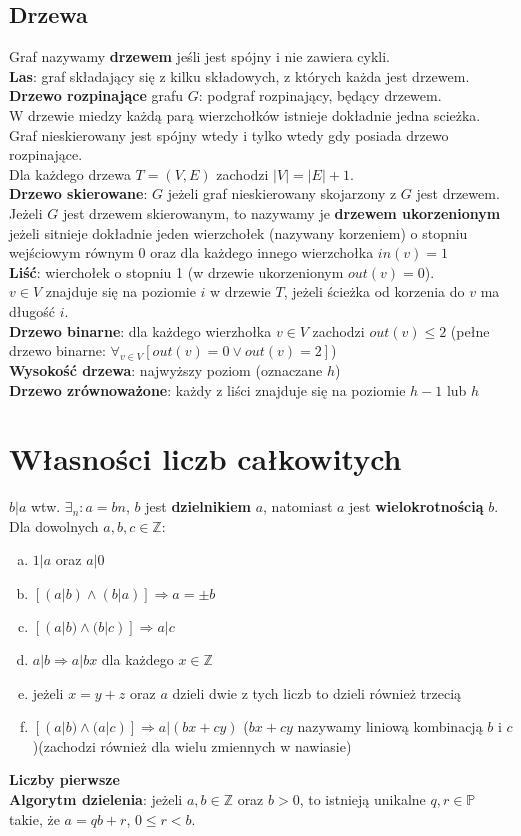 \documentclass[a4paper,12pt]{article}
\begin{document}
\subsection{Drzewa}
Graf nazywamy \textbf{drzewem} jeśli jest spójny i nie zawiera cykli.\\
\textbf{Las}: graf składający się z kilku składowych, z których każda jest drzewem.\\
\textbf{Drzewo rozpinające} grafu $G$: podgraf rozpinający, będący drzewem.\\
W drzewie miedzy każdą parą wierzchołków istnieje dokładnie jedna scieżka.\\
Graf nieskierowany jest spójny wtedy i tylko wtedy gdy posiada drzewo rozpinające.\\
Dla każdego drzewa $T=(V,E)$ zachodzi $|V|=|E|+1$.\\
\textbf{Drzewo skierowane}: $G$ jeżeli graf nieskierowany skojarzony z $G$ jest drzewem.\\
Jeżeli $G$ jest drzewem skierowanym, to nazywamy je \textbf{drzewem ukorzenionym} jeżeli sitnieje dokładnie jeden wierzchołek (nazywany korzeniem) o stopniu wejściowym równym $0$ oraz dla każdego innego wierzchołka $in(v)=1$\\
\textbf{Liść}: wierchołek o stopniu 1 (w drzewie ukorzenionym $out(v)=0$).\\
$v\in V$ znajduje się na poziomie $i$ w drzewie $T$, jeżeli ścieżka od korzenia do $v$ ma długość $i$.\\
\textbf{Drzewo binarne}: dla każdego wierzhołka $v\in V$ zachodzi $out(v)\leq2$ (pełne drzewo binarne: $\forall_{v\in V} [out(v)=0\vee out(v)=2]$)\\
\textbf{Wysokość drzewa}: najwyższy poziom (oznaczane $h$)\\
\textbf{Drzewo zrównoważone}: każdy z liści znajduje się na poziomie $h-1$ lub $h$
\section{Własności liczb całkowitych}
$b|a$ wtw. $\exists_n:a=bn$, $b$ jest \textbf{dzielnikiem} $a$, natomiast $a$ jest \textbf{wielokrotnością} $b$.\\
Dla dowolnych $a,b,c\in \mathbb{Z}$:
	\begin{enumerate}[a)]
		\item $1|a$ oraz $a|0$
		\item $[(a|b)\wedge(b|a)]\Rightarrow a=\pm b$
		\item $[(a|b)\wedge(b|c)]\Rightarrow a|c$
		\item $a|b \Rightarrow a|bx$ dla każdego $x\in\mathbb{Z}$
		\item jeżeli $x=y+z$ oraz $a$ dzieli dwie z tych liczb to dzieli również trzecią
		\item $[(a|b)\wedge(a|c)]\Rightarrow a|(bx+cy)$ ($bx+cy$ nazywamy liniową kombinacją $b$ i $c$)(zachodzi również dla wielu zmiennych w nawiasie)
	\end{enumerate}
\textbf{Liczby pierwsze}\\
\textbf{Algorytm dzielenia}: jeżeli $a, b \in \mathbb{Z}$ oraz $b>0$, to istnieją unikalne $q,r\in\mathbb{P}$ takie, że $a=qb+r$, $0\leq r <b$.
\end{document}
